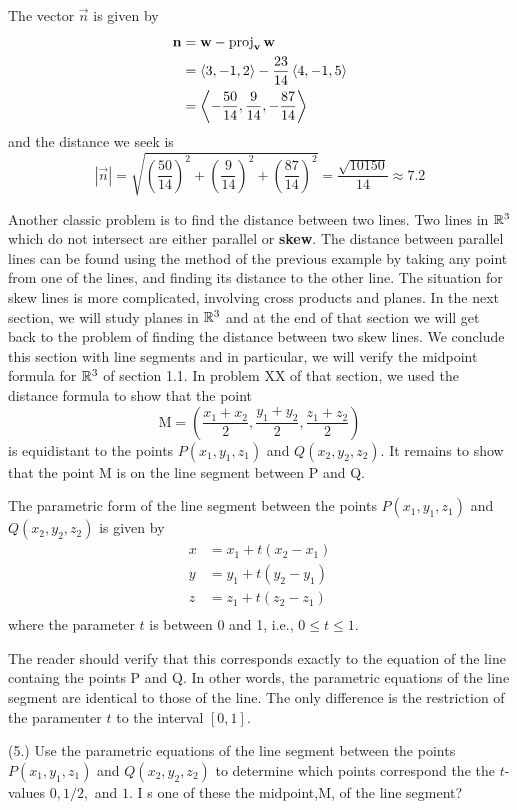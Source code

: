 \documentclass[handout]{ximera}
\begin{document}
\begin{example}[4.]
The vector $\vec{n}$ is given by
\begin{align*}
\mathbf{n} &= \mathbf{w} -  \operatorname{proj}_{\mathbf{v}} \mathbf{w}\\
&=\left\langle 3, -1, 2\right\rangle - \frac{23}{14}\left\langle 4,-1,5\right\rangle \\
&= \left\langle -\frac{50}{14},\frac{9}{14},-\frac{87}{14}\right\rangle
\end{align*}
and the distance we seek is
\[
|\vec{n}| = \sqrt{ \left(\frac{50}{14}\right)^2 +  \left(\frac{9}{14}\right)^2 + \left(\frac{87}{14}\right)^2} = \frac{\sqrt{10150}}{14}\approx 7.2
\]

\end{example}

Another classic problem is to find the distance between two lines.
Two lines in $\mathbb R^3$ which do not intersect are either parallel or {\bf skew}.  
The distance between parallel lines can be found using the method of the previous example by 
taking any point from one of the lines,
and finding its distance to the other line.
The situation for skew lines is more complicated, involving cross products and planes.
In the next section, we will study planes in $\mathbb R^3$ and at the end of that section we will get back to the 
problem of finding the distance between two skew lines.
We conclude this section with line segments and in particular, we will verify the 
midpoint formula for $\mathbb R^3$ of section 1.1.  In problem XX of that section, we used the distance formula to 
show that the point 
\[
\text{M} = \left(\frac{x_1 + x_2}{2}, \frac{y_1 + y_2}{2}, \frac{z_1 + z_2}{2}\right)
\]
is equidistant to the points $P(x_1, y_1, z_1)$ and $Q(x_2, y_2, z_2)$. 
It remains to show that the point M is on the line segment between P and Q.

\begin{definition}
The parametric form of the line segment between the points $P(x_1, y_1, z_1)$ and $Q(x_2, y_2, z_2)$
is given by
\begin{align*}
x &= x_1 + t(x_2 - x_1)\\
y &= y_1 + t(y_2 - y_1)\\
z &= z_1 + t(z_2 - z_1)\\
\end{align*}
where the parameter $t$ is between 0 and 1, i.e., $0 \leq t \leq 1$.
\end{definition}

The reader should verify that this corresponds exactly to the equation of the line containg the points P and Q.
In other words, the parametric equations of the line segment are identical to those of the line. 
The only difference is the restriction of the paramenter $t$ to the interval $[0,1]$. 
\begin{problem}(5.)
Use the parametric equations of the line segment between the points  $P(x_1, y_1, z_1)$ and $Q(x_2, y_2, z_2)$
to determine which points correspond the the $t$-values $0, 1/2, $ and $1$. I
s one of these the midpoint,M, of the line segment?
\end{problem}
 
\end{document}
